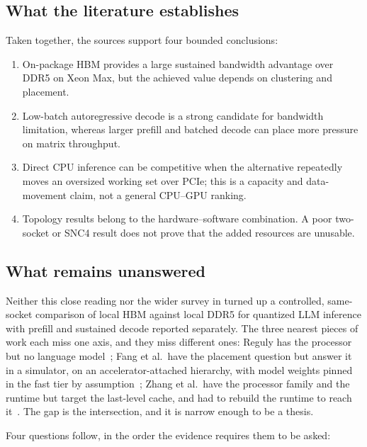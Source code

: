 \subsection{What the literature establishes}

Taken together, the sources support four bounded conclusions:

\begin{enumerate}
  \item On-package HBM provides a large sustained bandwidth advantage
        over DDR5 on Xeon Max, but the achieved value depends on
        clustering and placement.
  \item Low-batch autoregressive decode is a strong candidate for
        bandwidth limitation, whereas larger prefill and batched decode
        can place more pressure on matrix throughput.
  \item Direct CPU inference can be competitive when the alternative
        repeatedly moves an oversized working set over PCIe; this is a
        capacity and data-movement claim, not a general CPU--GPU ranking.
  \item Topology results belong to the hardware--software combination.
        A poor two-socket or SNC4 result does not prove that the added
        resources are unusable.
\end{enumerate}

\subsection{What remains unanswered}
\label{sec:research-gap}

Neither this close reading nor the wider survey in
 turned up a controlled, same-socket
comparison of local HBM against local DDR5 for quantized LLM inference
with prefill and sustained decode reported separately.  The three
nearest pieces of work each miss one axis, and they miss different ones:
Reguly has the processor but no language model~\cite{reguly2023xeonmax};
Fang et al.\ have the placement question but answer it in a simulator, on
an accelerator-attached hierarchy, with model weights pinned in the fast
tier by assumption~\cite{fang2025kvplacement}; Zhang et al.\ have the
processor family and the runtime but target the last-level cache, and
had to rebuild the runtime to reach it~\cite{zhang2026cacheresident}.
The gap is the intersection, and it is narrow enough to be a thesis.

Four questions follow, in the order the evidence requires them to be
asked:

